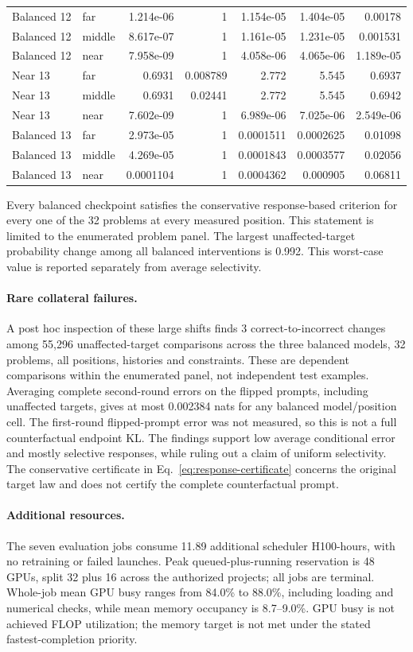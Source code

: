 \begin{table}[t]
\begin{tabular}{llrrrrr}
Balanced 12 & far & 1.214e-06 & 1 & 1.154e-05 & 1.404e-05 & 0.00178\\
Balanced 12 & middle & 8.617e-07 & 1 & 1.161e-05 & 1.231e-05 & 0.001531\\
Balanced 12 & near & 7.958e-09 & 1 & 4.058e-06 & 4.065e-06 & 1.189e-05\\
Near 13 & far & 0.6931 & 0.008789 & 2.772 & 5.545 & 0.6937\\
Near 13 & middle & 0.6931 & 0.02441 & 2.772 & 5.545 & 0.6942\\
Near 13 & near & 7.602e-09 & 1 & 6.989e-06 & 7.025e-06 & 2.549e-06\\
Balanced 13 & far & 2.973e-05 & 1 & 0.0001511 & 0.0002625 & 0.01098\\
Balanced 13 & middle & 4.269e-05 & 1 & 0.0001843 & 0.0003577 & 0.02056\\
Balanced 13 & near & 0.0001104 & 1 & 0.0004362 & 0.000905 & 0.06811\\
\bottomrule
\end{tabular}
\end{table}
Every balanced checkpoint satisfies the conservative response-based criterion for every one of the 32 problems at every measured position. This statement is limited to the enumerated problem panel.
The largest unaffected-target probability change among all balanced interventions is 0.992. This worst-case value is reported separately from average selectivity.
\paragraph{Rare collateral failures.}
A post hoc inspection of these large shifts finds 3 correct-to-incorrect changes among 55,296 unaffected-target comparisons across the three balanced models, 32 problems, all positions, histories and constraints. These are dependent comparisons within the enumerated panel, not independent test examples.
Averaging complete second-round errors on the flipped prompts, including unaffected targets, gives at most 0.002384 nats for any balanced model/position cell. The first-round flipped-prompt error was not measured, so this is not a full counterfactual endpoint KL.
The findings support low average conditional error and mostly selective responses, while ruling out a claim of uniform selectivity. The conservative certificate in Eq.~\eqref{eq:response-certificate} concerns the original target law and does not certify the complete counterfactual prompt.
\paragraph{Additional resources.}
The seven evaluation jobs consume 11.89 additional scheduler H100-hours, with no retraining or failed launches. Peak queued-plus-running reservation is 48 GPUs, split 32 plus 16 across the authorized projects; all jobs are terminal.
Whole-job mean GPU busy ranges from 84.0\% to 88.0\%, including loading and numerical checks, while mean memory occupancy is 8.7--9.0\%. GPU busy is not achieved FLOP utilization; the memory target is not met under the stated fastest-completion priority.
